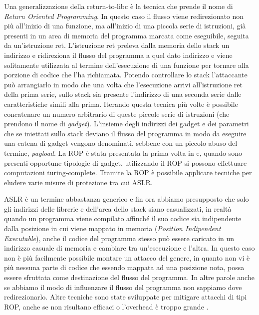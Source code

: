 Una generalizzazione della return-to-libc è la tecnica che prende il
nome di \emph{Return Oriented
  Programming}\cite{Shacham-2007,Roemer-2012}. In questo caso il
flusso viene redirezionato non più all'inizio di una funzione, ma
all'inizio di una piccola serie di istruzioni, già presenti in un area
di memoria del programma marcata come eseguibile, seguita da
un'istruzione ret. L'istruzione ret preleva dalla memoria dello stack
un indirizzo e ridireziona il flusso del programma a quel dato
indirizzo e viene solitamente utilizzata al termine dell'esecuzione di
una funzione per tornare alla porzione di codice che l'ha
richiamata. Potendo controllare lo stack l'attaccante può arrangiarlo
in modo che una volta che l'esecuzione arrivi all'istruzione ret della
prima serie, sullo stack sia presente l'indirizzo di una seconda serie
dalle caratteristiche simili alla prima. Iterando questa tecnica più
volte è possibile concatenare un numero arbitrario di queste piccole
serie di istruzioni (che prendono il nome di \emph{gadget}). L'insieme
degli indirizzi dei gadget e dei parametri che se iniettati sullo
stack deviano il flusso del programma in modo da eseguire una catena
di gadget vengono denominati, sebbene con un piccolo abuso del
termine, \emph{payload}. La ROP è stata presentata la prima volta in
\cite{Shacham-2007} e, quando sono presenti opportune tipologie di
gadget, utilizzando il ROP si possono effettuare computazioni
turing-complete. Tramite la ROP è possibile applicare tecniche per
eludere varie misure di protezione \cite{roglia:2009} tra cui ASLR.

ASLR è un termine abbastanza generico e fin ora abbiamo presupposto
che solo gli indirizzi delle librerie e dell'area dello stack siano
casualizzati, in realtà quando un programma viene compilato affinché
il suo codice sia indipendente dalla posizione in cui viene mappato in
memoria (\emph{Position Indipendent Executable}), anche il codice del
programma stesso può essere caricato in un indirizzo casuale di
memoria e cambiare tra un'esecuzione e l'altra. In questo caso non è
più facilmente possibile montare un attacco del genere, in quanto non
vi è più nessuna parte di codice che essendo mappata ad una posizione
nota, possa essere sfruttata come destinazione del flusso del
programma. In altre parole anche se abbiamo il modo di influenzare il
flusso del programma non sappiamo dove redirezionarlo. Altre tecniche
sono state sviluppate per mitigare attacchi di tipi ROP, anche se non
risultano efficaci o l'overhead è troppo grande \cite{Davi-2014}.

